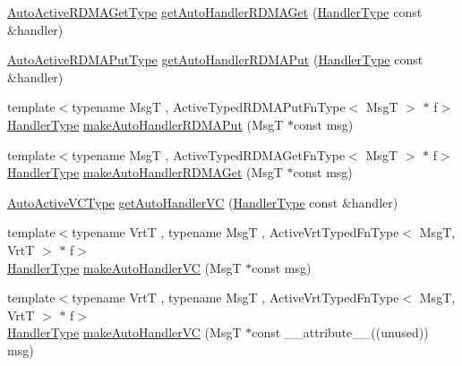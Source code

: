 \begin{DoxyCompactItemize}
\item 
\hyperlink{namespacevt_1_1auto__registry_a039813f93a5804c77ae612e0318fb335}{Auto\+Active\+R\+D\+M\+A\+Get\+Type} \hyperlink{namespacevt_1_1auto__registry_a4b0ed1bbbf713383c191339ca281cf0e}{get\+Auto\+Handler\+R\+D\+M\+A\+Get} (\hyperlink{namespacevt_af64846b57dfcaf104da3ef6967917573}{Handler\+Type} const \&handler)
\item 
\hyperlink{namespacevt_1_1auto__registry_a1f67d3efa37b61040b56258ca59df088}{Auto\+Active\+R\+D\+M\+A\+Put\+Type} \hyperlink{namespacevt_1_1auto__registry_a7028bf338698e86e44901669886e3250}{get\+Auto\+Handler\+R\+D\+M\+A\+Put} (\hyperlink{namespacevt_af64846b57dfcaf104da3ef6967917573}{Handler\+Type} const \&handler)
\item 
{\footnotesize template$<$typename MsgT , Active\+Typed\+R\+D\+M\+A\+Put\+Fn\+Type$<$ Msg\+T $>$ $\ast$ f$>$ }\\\hyperlink{namespacevt_af64846b57dfcaf104da3ef6967917573}{Handler\+Type} \hyperlink{namespacevt_1_1auto__registry_a503593dc49a12ea9e87e92ff10493bbe}{make\+Auto\+Handler\+R\+D\+M\+A\+Put} (MsgT $\ast$const msg)
\item 
{\footnotesize template$<$typename MsgT , Active\+Typed\+R\+D\+M\+A\+Get\+Fn\+Type$<$ Msg\+T $>$ $\ast$ f$>$ }\\\hyperlink{namespacevt_af64846b57dfcaf104da3ef6967917573}{Handler\+Type} \hyperlink{namespacevt_1_1auto__registry_a39843aa07e65ad269c6d5992fb00a78b}{make\+Auto\+Handler\+R\+D\+M\+A\+Get} (MsgT $\ast$const msg)
\item 
\hyperlink{namespacevt_1_1auto__registry_a4a96fdbb11b7be748365fcfc6fc46862}{Auto\+Active\+V\+C\+Type} \hyperlink{namespacevt_1_1auto__registry_a4cc84f041f735f3c7ea17e4f066d6eb1}{get\+Auto\+Handler\+VC} (\hyperlink{namespacevt_af64846b57dfcaf104da3ef6967917573}{Handler\+Type} const \&handler)
\item 
{\footnotesize template$<$typename VrtT , typename MsgT , Active\+Vrt\+Typed\+Fn\+Type$<$ Msg\+T, Vrt\+T $>$ $\ast$ f$>$ }\\\hyperlink{namespacevt_af64846b57dfcaf104da3ef6967917573}{Handler\+Type} \hyperlink{namespacevt_1_1auto__registry_aca4bcdfdc2d353195a9881e7d41e701f}{make\+Auto\+Handler\+VC} (MsgT $\ast$const msg)
\item 
{\footnotesize template$<$typename VrtT , typename MsgT , Active\+Vrt\+Typed\+Fn\+Type$<$ Msg\+T, Vrt\+T $>$ $\ast$ f$>$ }\\\hyperlink{namespacevt_af64846b57dfcaf104da3ef6967917573}{Handler\+Type} \hyperlink{namespacevt_1_1auto__registry_a8df7b08365e8ac619c32917114885170}{make\+Auto\+Handler\+VC} (MsgT $\ast$const \+\_\+\+\_\+attribute\+\_\+\+\_\+((unused)) msg)
\end{DoxyCompactItemize}


